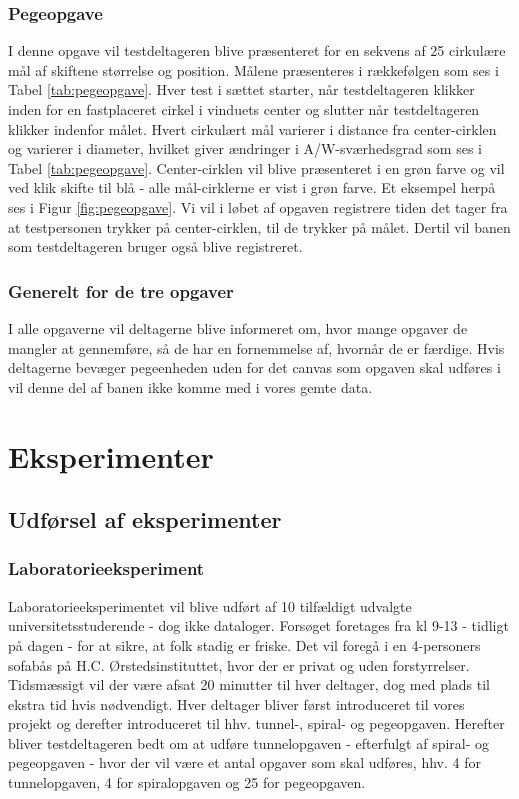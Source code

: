 \subsection*{Pegeopgave}
I denne opgave vil testdeltageren blive præsenteret for en sekvens af 25 cirkulære mål af skiftene størrelse og position. Målene præsenteres i rækkefølgen som ses i Tabel \ref{tab:pegeopgave}. Hver test i sættet starter, når testdeltageren klikker inden for en fastplaceret cirkel i vinduets center og slutter når testdeltageren klikker indenfor målet. Hvert cirkulært mål varierer i distance fra center-cirklen og varierer i diameter, hvilket giver ændringer i A/W-sværhedsgrad som ses i Tabel \ref{tab:pegeopgave}. Center-cirklen vil  blive præsenteret i en grøn farve og vil ved klik skifte til blå - alle mål-cirklerne er vist i grøn farve. Et eksempel herpå ses i Figur \ref{fig:pegeopgave}. Vi vil i løbet af opgaven registrere tiden det tager fra at testpersonen trykker på center-cirklen, til de trykker på målet. Dertil vil banen som testdeltageren bruger også blive registreret.

\subsection*{Generelt for de tre opgaver}
I alle opgaverne vil deltagerne blive informeret om, hvor mange opgaver de mangler at gennemføre, så de har en fornemmelse af, hvornår de er færdige. Hvis deltagerne bevæger pegeenheden uden for det canvas som opgaven skal udføres i vil denne del af banen ikke komme med i vores gemte data.

\chapter*{Eksperimenter}

\section*{Udførsel af eksperimenter}

\subsection*{Laboratorieeksperiment}
Laboratorieeksperimentet vil blive udført af 10 tilfældigt udvalgte universitetsstuderende - dog ikke dataloger.
Forsøget foretages fra kl 9-13 - tidligt på dagen - for at sikre, at folk stadig er friske. Det vil foregå i en 4-personers sofabås på H.C. Ørstedsinstituttet, hvor der er privat og uden forstyrrelser.
Tidsmæssigt vil der være afsat 20 minutter til hver deltager, dog med plads til ekstra tid hvis nødvendigt.
Hver deltager bliver først introduceret til vores projekt og derefter introduceret til hhv. tunnel-, spiral- og pegeopgaven.
Herefter bliver testdeltageren bedt om at udføre tunnelopgaven - efterfulgt af spiral- og pegeopgaven - hvor der vil være et antal opgaver som skal udføres, hhv. 4 for tunnelopgaven, 4 for spiralopgaven og 25 for pegeopgaven.

